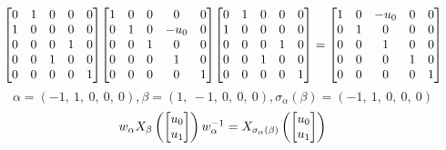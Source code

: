 \documentclass[11pt]{article}
\theoremstyle{definition}
\begin{document}
\[
\scaletoalign{\textwidth}{{\left[\begin{matrix}0 & 1 & 0 & 0 & 0\\1 & 0 & 0 & 0 & 0\\0 & 0 & 0 & 1 & 0\\0 & 0 & 1 & 0 & 0\\0 & 0 & 0 & 0 & 1\end{matrix}\right]} {\left[\begin{matrix}1 & 0 & 0 & 0 & 0\\0 & 1 & 0 & - u_{0} & 0\\0 & 0 & 1 & 0 & 0\\0 & 0 & 0 & 1 & 0\\0 & 0 & 0 & 0 & 1\end{matrix}\right]} {\left[\begin{matrix}0 & 1 & 0 & 0 & 0\\1 & 0 & 0 & 0 & 0\\0 & 0 & 0 & 1 & 0\\0 & 0 & 1 & 0 & 0\\0 & 0 & 0 & 0 & 1\end{matrix}\right]} = {\left[\begin{matrix}1 & 0 & - u_{0} & 0 & 0\\0 & 1 & 0 & 0 & 0\\0 & 0 & 1 & 0 & 0\\0 & 0 & 0 & 1 & 0\\0 & 0 & 0 & 0 & 1\end{matrix}\right]}}
\]
\[
\alpha = \left( -1, \  1, \  0, \  0, \  0\right), \beta = \left( 1, \  -1, \  0, \  0, \  0\right), \sigma_{\alpha}(\beta) = \left( -1, \  1, \  0, \  0, \  0\right)
\]
\[
\scaletoalign{\textwidth}{w_{\alpha} X_{\beta}\left(\left[\begin{matrix}u_{0}\\u_{1}\end{matrix}\right]\right) w_{\alpha}^{-1} = X_{\sigma_{\alpha}\left(\beta\right)}\left(\left[\begin{matrix}u_{0}\\u_{1}\end{matrix}\right]\right)}
\]
\end{document}
